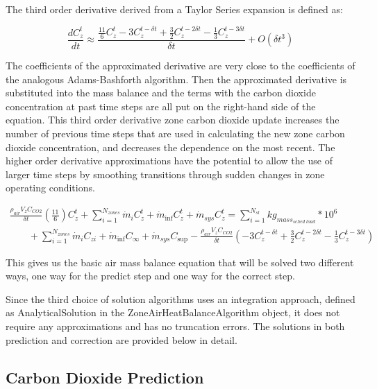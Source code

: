 The third order derivative derived from a Taylor Series expansion is defined as:

\begin{equation}
\frac{{dC_z^t}}{{dt}} \approx \frac{{\frac{{11}}{6}C_z^t - 3C_z^{t - \delta t} + \frac{3}{2}C_z^{t - 2\delta t} - \frac{1}{3}C_z^{t - 3\delta t}}}{{\delta t}} + O(\delta {t^3})
\end{equation}

The coefficients of the approximated derivative are very close to the coefficients of the analogous Adams-Bashforth algorithm. Then the approximated derivative is substituted into the mass balance and the terms with the carbon dioxide concentration at past time steps are all put on the right-hand side of the equation. This third order derivative zone carbon dioxide update increases the number of previous time steps that are used in calculating the new zone carbon dioxide concentration, and decreases the dependence on the most recent. The higher order derivative approximations have the potential to allow the use of larger time steps by smoothing transitions through sudden changes in zone operating conditions.

\begin{equation}
\begin{array}{l}\frac{{{\rho_{air}}{V_z}{C_{CO2}}}}{{\delta t}}\left( {\frac{{11}}{6}} \right)C_z^t + \sum\limits_{i = 1}^{{N_{zones}}} {{{\dot m}_i}} C_z^t + {{\dot m}_{\inf }}C_z^t + {{\dot m}_{sys}}C_z^t = \sum\limits_{i = 1}^{{N_{sl}}} {k{g_{mas{s_{sched\;load}}}}} *{10^6}\\\;\;\;\;\;\;\; + \sum\limits_{i = 1}^{{N_{zones}}} {{{\dot m}_i}} {C_{zi}} + {{\dot m}_{\inf }}{C_\infty } + {{\dot m}_{sys}}{C_{\sup }} - \frac{{{\rho_{air}}{V_z}{C_{CO2}}}}{{\delta t}}( - 3C_z^{t - \delta t} + \frac{3}{2}C_z^{t - 2\delta t} - \frac{1}{3}C_z^{t - 3\delta t})\end{array}
\end{equation}

This gives us the basic air mass balance equation that will be solved two different ways, one way for the predict step and one way for the correct step.

Since the third choice of solution algorithms uses an integration approach, defined as AnalyticalSolution in the ZoneAirHeatBalanceAlgorithm object, it does not require any approximations and has no truncation errors. The solutions in both prediction and correction are provided below in detail.

\subsection{Carbon Dioxide Prediction}\label{carbon-dioxide-prediction}

